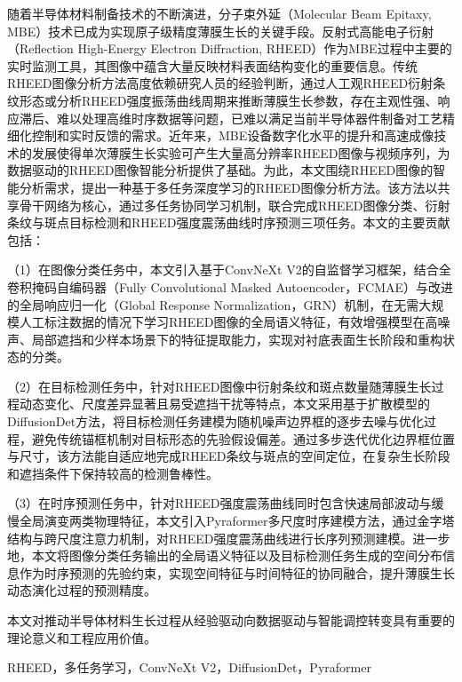 \begin{abstractCN}
\setlength{\baselineskip}{23pt} %


随着半导体材料制备技术的不断演进，分子束外延（Molecular Beam Epitaxy, MBE）技术已成为实现原子级精度薄膜生长的关键手段。反射式高能电子衍射（Reflection High-Energy Electron Diffraction, RHEED）作为MBE过程中主要的实时监测工具，其图像中蕴含大量反映材料表面结构变化的重要信息。传统RHEED图像分析方法高度依赖研究人员的经验判断，通过人工观RHEED衍射条纹形态或分析RHEED强度振荡曲线周期来推断薄膜生长参数，存在主观性强、响应滞后、难以处理高维时序数据等问题，已难以满足当前半导体器件制备对工艺精细化控制和实时反馈的需求。近年来，MBE设备数字化水平的提升和高速成像技术的发展使得单次薄膜生长实验可产生大量高分辨率RHEED图像与视频序列，为数据驱动的RHEED图像智能分析提供了基础。为此，本文围绕RHEED图像的智能分析需求，提出一种基于多任务深度学习的RHEED图像分析方法。该方法以共享骨干网络为核心，通过多任务协同学习机制，联合完成RHEED图像分类、衍射条纹与斑点目标检测和RHEED强度震荡曲线时序预测三项任务。本文的主要贡献包括：

（1）在图像分类任务中，本文引入基于ConvNeXt V2的自监督学习框架，结合全卷积掩码自编码器（Fully Convolutional Masked Autoencoder，FCMAE）与改进的全局响应归一化（Global Response Normalization，GRN）机制，在无需大规模人工标注数据的情况下学习RHEED图像的全局语义特征，有效增强模型在高噪声、局部遮挡和少样本场景下的特征提取能力，实现对衬底表面生长阶段和重构状态的分类。

（2）在目标检测任务中，针对RHEED图像中衍射条纹和斑点数量随薄膜生长过程动态变化、尺度差异显著且易受遮挡干扰等特点，本文采用基于扩散模型的DiffusionDet方法，将目标检测任务建模为随机噪声边界框的逐步去噪与优化过程，避免传统锚框机制对目标形态的先验假设偏差。通过多步迭代优化边界框位置与尺寸，该方法能自适应地完成RHEED条纹与斑点的空间定位，在复杂生长阶段和遮挡条件下保持较高的检测鲁棒性。

（3）在时序预测任务中，针对RHEED强度震荡曲线同时包含快速局部波动与缓慢全局演变两类物理特征，本文引入Pyraformer多尺度时序建模方法，通过金字塔结构与跨尺度注意力机制，对RHEED强度震荡曲线进行长序列预测建模。进一步地，本文将图像分类任务输出的全局语义特征以及目标检测任务生成的空间分布信息作为时序预测的先验约束，实现空间特征与时间特征的协同融合，提升薄膜生长动态演化过程的预测精度。

本文对推动半导体材料生长过程从经验驱动向数据驱动与智能调控转变具有重要的理论意义和工程应用价值。
\end{abstractCN}


\begin{keywordCN}
RHEED，多任务学习，ConvNeXt V2，DiffusionDet，Pyraformer
\end{keywordCN}

